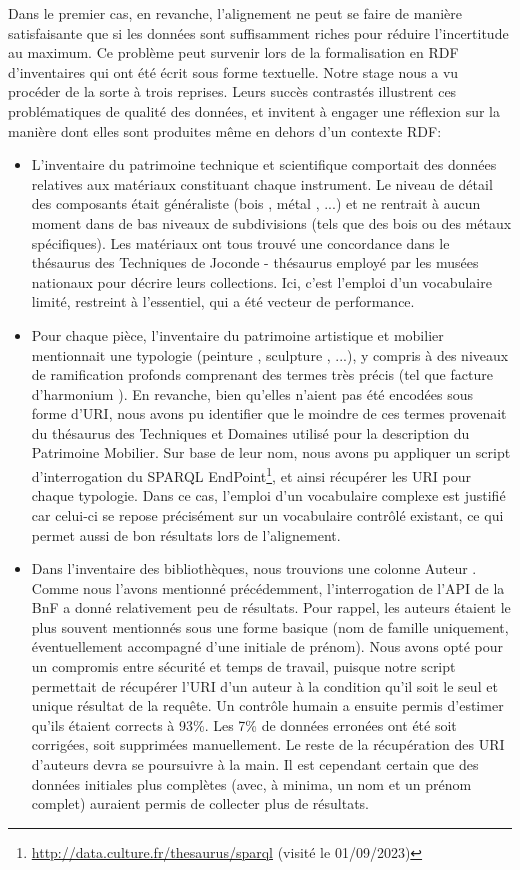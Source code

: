 \documentclass[a4paper,12pt,twoside]{book}
\begin{document}
Dans le premier cas, en revanche, l'alignement ne peut se faire de manière satisfaisante que si les données sont suffisamment riches pour réduire l'incertitude au maximum. Ce problème peut survenir lors de la formalisation en RDF d'inventaires qui ont été écrit sous forme textuelle. Notre stage nous a vu procéder de la sorte à trois reprises. Leurs succès contrastés illustrent ces problématiques de qualité des données, et invitent à engager une réflexion sur la manière dont elles sont produites même en dehors d'un contexte RDF:
\begin{itemize}
    \item L'inventaire du patrimoine technique et scientifique comportait des données relatives aux matériaux constituant chaque instrument. Le niveau de détail des composants était généraliste (\og bois \fg, \og métal \fg, ...) et ne rentrait à aucun moment dans de bas niveaux de subdivisions (tels que des bois ou des métaux spécifiques). Les matériaux ont tous trouvé une concordance dans le thésaurus des Techniques de Joconde - thésaurus employé par les musées nationaux pour décrire leurs collections. Ici, c'est l'emploi d'un vocabulaire limité, restreint à l'essentiel, qui a été vecteur de performance.
    \item Pour chaque pièce, l'inventaire du patrimoine artistique et mobilier mentionnait une typologie (\og peinture \fg, \og sculpture \fg, ...), y compris à des niveaux de ramification profonds comprenant des termes très précis (tel que \og facture d'harmonium \fg). En revanche, bien qu'elles n'aient pas été encodées sous forme d'URI, nous avons pu identifier que le moindre de ces termes provenait du thésaurus des Techniques et Domaines utilisé pour la description du Patrimoine Mobilier. Sur base de leur nom, nous avons pu appliquer un script d'interrogation du SPARQL EndPoint\footnote{\url{http://data.culture.fr/thesaurus/sparql} (visité le 01/09/2023)}, et ainsi récupérer les URI pour chaque typologie. Dans ce cas, l'emploi d'un vocabulaire complexe est justifié car celui-ci se repose précisément sur un vocabulaire contrôlé existant, ce qui permet aussi de bon résultats lors de l'alignement.
    \item Dans l'inventaire des bibliothèques, nous trouvions une colonne \og Auteur \fg. Comme nous l'avons mentionné précédemment, l'interrogation de l'API de la BnF a donné relativement peu de résultats. Pour rappel, les auteurs étaient le plus souvent mentionnés sous une forme basique (nom de famille uniquement, éventuellement accompagné d'une initiale de prénom). Nous avons opté pour un compromis entre sécurité et temps de travail, puisque notre script permettait de récupérer l'URI d'un auteur à la condition qu'il soit le seul et unique résultat de la requête. Un contrôle humain a ensuite permis d'estimer qu'ils étaient corrects à 93\%. Les 7\% de données erronées ont été soit corrigées, soit supprimées manuellement. Le reste de la récupération des URI d'auteurs devra se poursuivre à la main. Il est cependant certain que des données initiales plus complètes (avec, à minima, un nom et un prénom complet) auraient permis de collecter plus de résultats. 
\end{itemize}
\end{document}
